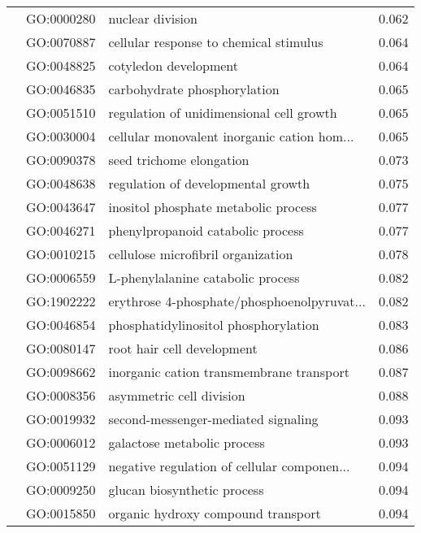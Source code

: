 \begin{longtable}{lllr}
   & GO:0000280 &                             nuclear division &         0.062 \\
   & GO:0070887 &       cellular response to chemical stimulus &         0.064 \\
   & GO:0048825 &                        cotyledon development &         0.064 \\
   & GO:0046835 &                 carbohydrate phosphorylation &         0.065 \\
   & GO:0051510 &     regulation of unidimensional cell growth &         0.065 \\
   & GO:0030004 &  cellular monovalent inorganic cation hom... &         0.065 \\
   & GO:0090378 &                     seed trichome elongation &         0.073 \\
   & GO:0048638 &           regulation of developmental growth &         0.075 \\
   & GO:0043647 &         inositol phosphate metabolic process &         0.077 \\
   & GO:0046271 &            phenylpropanoid catabolic process &         0.077 \\
   & GO:0010215 &           cellulose microfibril organization &         0.078 \\
   & GO:0006559 &            L-phenylalanine catabolic process &         0.082 \\
   & GO:1902222 &  erythrose 4-phosphate/phosphoenolpyruvat... &         0.082 \\
   & GO:0046854 &         phosphatidylinositol phosphorylation &         0.083 \\
   & GO:0080147 &                   root hair cell development &         0.086 \\
   & GO:0098662 &     inorganic cation transmembrane transport &         0.087 \\
   & GO:0008356 &                     asymmetric cell division &         0.088 \\
   & GO:0019932 &          second-messenger-mediated signaling &         0.093 \\
   & GO:0006012 &                  galactose metabolic process &         0.093 \\
   & GO:0051129 &  negative regulation of cellular componen... &         0.094 \\
   & GO:0009250 &                  glucan biosynthetic process &         0.094 \\
   & GO:0015850 &           organic hydroxy compound transport &         0.094 \\

\end{longtable}

